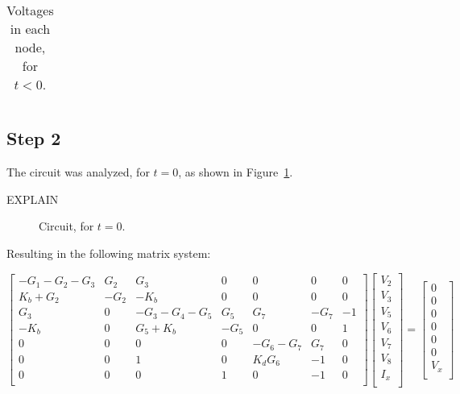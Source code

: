 \begin{table}[ht!]
  \centering
  \begin{tabular}{cc}
  \end{tabular}
  \caption{Voltages in each node, for $t<0$.}
  \label{tab:teo1}
\end{table}







\subsection{Step 2}
The circuit was analyzed, for $t=0$, as shown in Figure~\ref{fig:t2-2}.


{\color{red}
\Huge EXPLAIN
}

\begin{figure}[ht!]
  \centering
  \caption{Circuit, for $t=0$.}
  \label{fig:t2-2}
\end{figure}

Resulting in the following matrix system:

\begin{equation}\label{nodeM}
  \begin{bmatrix}
    -G_1-G_2-G_3 & G_2 & G_3 & 0 & 0 & 0 & 0 \\
    K_b+G_2 & -G_2 & -K_b & 0 & 0 & 0 & 0 \\
    G_3 & 0 & -G_3-G_4-G_5 & G_5 & G_7 & -G_7 & -1 \\
    -K_b & 0 & G_5+K_b & -G_5 & 0 & 0 & 1 \\
    0 & 0 & 0 & 0 & -G_6-G_7 & G_7 & 0\\
    0 & 0 & 1 & 0 & K_dG_6 & -1 & 0\\
    0 & 0 & 0 & 1 & 0 & -1 & 0\\
  \end{bmatrix}
  \begin{bmatrix}
    V_2\\
    V_3\\
    V_5\\
    V_6\\
    V_7\\
    V_8\\
    I_x\\
  \end{bmatrix}
  =
  \begin{bmatrix}
    0\\
    0\\
    0\\
    0\\
    0\\
    0\\
    V_x\\
  \end{bmatrix}
\end{equation}

